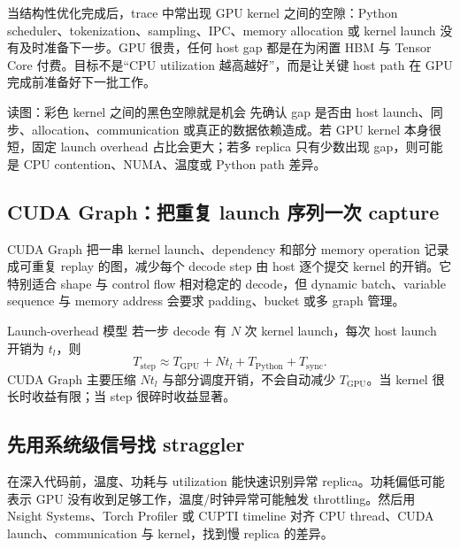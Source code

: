 当结构性优化完成后，trace 中常出现 GPU kernel 之间的空隙：Python scheduler、tokenization、sampling、IPC、memory allocation 或 kernel launch 没有及时准备下一步。GPU 很贵，任何 host gap 都是在为闲置 HBM 与 Tensor Core 付费。目标不是“CPU utilization 越高越好”，而是让关键 host path 在 GPU 完成前准备好下一批工作。


\begin{knowledgebox}{读图：彩色 kernel 之间的黑色空隙就是机会}
先确认 gap 是否由 host launch、同步、allocation、communication 或真正的数据依赖造成。若 GPU kernel 本身很短，固定 launch overhead 占比会更大；若多 replica 只有少数出现 gap，则可能是 CPU contention、NUMA、温度或 Python path 差异。
\end{knowledgebox}

\subsection{CUDA Graph：把重复 launch 序列一次 capture}

CUDA Graph 把一串 kernel launch、dependency 和部分 memory operation 记录成可重复 replay 的图，减少每个 decode step 由 host 逐个提交 kernel 的开销。它特别适合 shape 与 control flow 相对稳定的 decode，但 dynamic batch、variable sequence 与 memory address 会要求 padding、bucket 或多 graph 管理。


\begin{importantbox}{Launch-overhead 模型}
若一步 decode 有 $N$ 次 kernel launch，每次 host launch 开销为 $t_l$，则
\[
T_{\mathrm{step}}\approx T_{\mathrm{GPU}}+Nt_l+T_{\mathrm{Python}}+T_{\mathrm{sync}}.
\]
CUDA Graph 主要压缩 $Nt_l$ 与部分调度开销，不会自动减少 $T_{\mathrm{GPU}}$。当 kernel 很长时收益有限；当 step 很碎时收益显著。
\end{importantbox}

\subsection{先用系统级信号找 straggler}

在深入代码前，温度、功耗与 utilization 能快速识别异常 replica。功耗偏低可能表示 GPU 没有收到足够工作，温度/时钟异常可能触发 throttling。然后用 Nsight Systems、Torch Profiler 或 CUPTI timeline 对齐 CPU thread、CUDA launch、communication 与 kernel，找到慢 replica 的差异。

